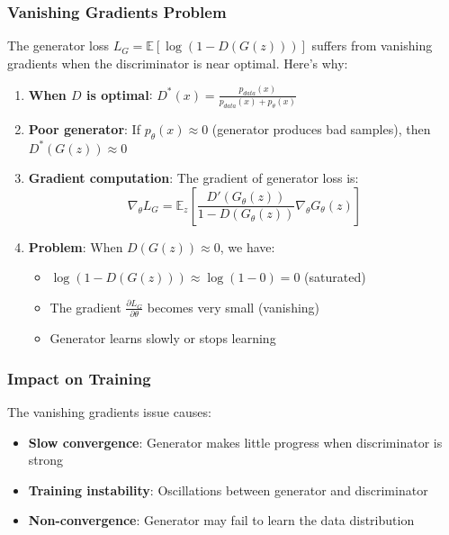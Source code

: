 \documentclass[conference,12pt]{IEEEtran}
\begin{document}
\subsubsection{Vanishing Gradients Problem}

The generator loss $L_G = \mathbb{E}[\log(1-D(G(z)))]$ suffers from vanishing gradients when the discriminator is near optimal. Here's why:

\begin{enumerate}
    \item \textbf{When $D$ is optimal}: $D^*(x) = \frac{p_{data}(x)}{p_{data}(x) + p_\theta(x)}$
    
    \item \textbf{Poor generator}: If $p_\theta(x) \approx 0$ (generator produces bad samples), then $D^*(G(z)) \approx 0$
    
    \item \textbf{Gradient computation}: The gradient of generator loss is:
    \begin{equation}
        \nabla_\theta L_G = \mathbb{E}_{z} \left[ \frac{D'(G_\theta(z))}{1-D(G_\theta(z))} \nabla_\theta G_\theta(z) \right]
    \end{equation}
    
    \item \textbf{Problem}: When $D(G(z)) \approx 0$, we have:
    \begin{itemize}
        \item $\log(1-D(G(z))) \approx \log(1-0) = 0$ (saturated)
        \item The gradient $\frac{\partial L_G}{\partial \theta}$ becomes very small (vanishing)
        \item Generator learns slowly or stops learning
    \end{itemize}
\end{enumerate}

\subsubsection{Impact on Training}

The vanishing gradients issue causes:
\begin{itemize}
    \item \textbf{Slow convergence}: Generator makes little progress when discriminator is strong
    \item \textbf{Training instability}: Oscillations between generator and discriminator
    \item \textbf{Non-convergence}: Generator may fail to learn the data distribution
\end{itemize}
\end{document}
